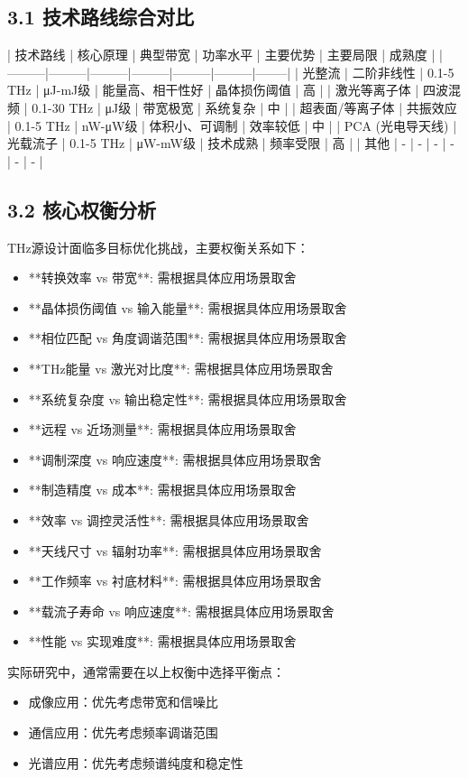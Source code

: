 \documentclass[12pt]{article}
\begin{document}
\subsection{3.1 技术路线综合对比}

| 技术路线 | 核心原理 | 典型带宽 | 功率水平 | 主要优势 | 主要局限 | 成熟度 |
|---------|---------|---------|---------|---------|---------|--------|
| 光整流 | 二阶非线性 | 0.1-5 THz | μJ-mJ级 | 能量高、相干性好 | 晶体损伤阈值 | 高 |
| 激光等离子体 | 四波混频 | 0.1-30 THz | μJ级 | 带宽极宽 | 系统复杂 | 中 |
| 超表面/等离子体 | 共振效应 | 0.1-5 THz | nW-μW级 | 体积小、可调制 | 效率较低 | 中 |
| PCA (光电导天线) | 光载流子 | 0.1-5 THz | μW-mW级 | 技术成熟 | 频率受限 | 高 |
| 其他 | - | - | - | - | - | - |


\subsection{3.2 核心权衡分析}

THz源设计面临多目标优化挑战，主要权衡关系如下：
\begin{itemize}
\item **转换效率 vs 带宽**: 需根据具体应用场景取舍
\item **晶体损伤阈值 vs 输入能量**: 需根据具体应用场景取舍
\item **相位匹配 vs 角度调谐范围**: 需根据具体应用场景取舍
\item **THz能量 vs 激光对比度**: 需根据具体应用场景取舍
\item **系统复杂度 vs 输出稳定性**: 需根据具体应用场景取舍
\item **远程 vs 近场测量**: 需根据具体应用场景取舍
\item **调制深度 vs 响应速度**: 需根据具体应用场景取舍
\item **制造精度 vs 成本**: 需根据具体应用场景取舍
\item **效率 vs 调控灵活性**: 需根据具体应用场景取舍
\item **天线尺寸 vs 辐射功率**: 需根据具体应用场景取舍
\item **工作频率 vs 衬底材料**: 需根据具体应用场景取舍
\item **载流子寿命 vs 响应速度**: 需根据具体应用场景取舍
\item **性能 vs 实现难度**: 需根据具体应用场景取舍
\end{itemize}

实际研究中，通常需要在以上权衡中选择平衡点：
\begin{itemize}
\item 成像应用：优先考虑带宽和信噪比
\item 通信应用：优先考虑频率调谐范围
\item 光谱应用：优先考虑频谱纯度和稳定性
\end{itemize}
\end{document}
